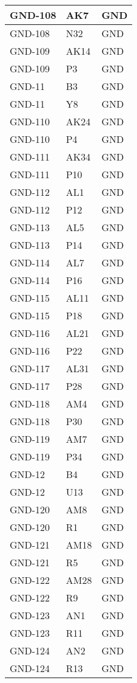 \begin{footnotesize}
\begin{longtable}{|p{7cm}|p{1cm}|p{5cm}|}
GND-108	&	AK7	&	GND	\\ \hline
GND-108	&	N32	&	GND	\\ \hline
GND-109	&	AK14	&	GND	\\ \hline
GND-109	&	P3	&	GND	\\ \hline
GND-11	&	B3	&	GND	\\ \hline
GND-11	&	Y8	&	GND	\\ \hline
GND-110	&	AK24	&	GND	\\ \hline
GND-110	&	P4	&	GND	\\ \hline
GND-111	&	AK34	&	GND	\\ \hline
GND-111	&	P10	&	GND	\\ \hline
GND-112	&	AL1	&	GND	\\ \hline
GND-112	&	P12	&	GND	\\ \hline
GND-113	&	AL5	&	GND	\\ \hline
GND-113	&	P14	&	GND	\\ \hline
GND-114	&	AL7	&	GND	\\ \hline
GND-114	&	P16	&	GND	\\ \hline
GND-115	&	AL11	&	GND	\\ \hline
GND-115	&	P18	&	GND	\\ \hline
GND-116	&	AL21	&	GND	\\ \hline
GND-116	&	P22	&	GND	\\ \hline
GND-117	&	AL31	&	GND	\\ \hline
GND-117	&	P28	&	GND	\\ \hline
GND-118	&	AM4	&	GND	\\ \hline
GND-118	&	P30	&	GND	\\ \hline
GND-119	&	AM7	&	GND	\\ \hline
GND-119	&	P34	&	GND	\\ \hline
GND-12	&	B4	&	GND	\\ \hline
GND-12	&	U13	&	GND	\\ \hline
GND-120	&	AM8	&	GND	\\ \hline
GND-120	&	R1	&	GND	\\ \hline
GND-121	&	AM18	&	GND	\\ \hline
GND-121	&	R5	&	GND	\\ \hline
GND-122	&	AM28	&	GND	\\ \hline
GND-122	&	R9	&	GND	\\ \hline
GND-123	&	AN1	&	GND	\\ \hline
GND-123	&	R11	&	GND	\\ \hline
GND-124	&	AN2	&	GND	\\ \hline
GND-124	&	R13	&	GND	\\ \hline

\end{longtable}
\end{footnotesize}
